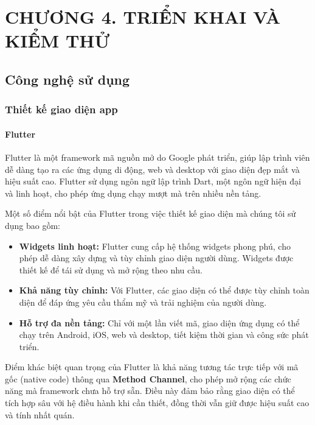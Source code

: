 
\section*{CHƯƠNG 4. TRIỂN KHAI VÀ KIỂM THỬ}
\setcounter{section}{4}
\setcounter{subsection}{0} %
\setcounter{table}{0} %
\setcounter{figure}{0} %

\subsection{Công nghệ sử dụng}
\subsubsection{Thiết kế giao diện app}
\paragraph{Flutter}
\mbox{}

Flutter là một framework mã nguồn mở do Google phát triển, giúp lập trình viên dễ dàng tạo ra các ứng dụng di động, web và desktop với giao diện đẹp mắt và hiệu suất cao. Flutter sử dụng ngôn ngữ lập trình Dart, một ngôn ngữ hiện đại và linh hoạt, cho phép ứng dụng chạy mượt mà trên nhiều nền tảng.

Một số điểm nổi bật của Flutter trong việc thiết kế giao diện mà chúng tôi sử dụng bao gồm:
\begin{itemize}
    \item \textbf{Widgets linh hoạt:} Flutter cung cấp hệ thống widgets phong phú, cho phép dễ dàng xây dựng và tùy chỉnh giao diện người dùng. Widgets được thiết kế để tái sử dụng và mở rộng theo nhu cầu.
    \item \textbf{Khả năng tùy chỉnh:} Với Flutter, các giao diện có thể được tùy chỉnh toàn diện để đáp ứng yêu cầu thẩm mỹ và trải nghiệm của người dùng.
    \item \textbf{Hỗ trợ đa nền tảng:} Chỉ với một lần viết mã, giao diện ứng dụng có thể chạy trên Android, iOS, web và desktop, tiết kiệm thời gian và công sức phát triển.
\end{itemize}

Điểm khác biệt quan trọng của Flutter là khả năng tương tác trực tiếp với mã gốc (native code) thông qua \textbf{Method Channel}, cho phép mở rộng các chức năng mà framework chưa hỗ trợ sẵn. Điều này đảm bảo rằng giao diện có thể tích hợp sâu với hệ điều hành khi cần thiết, đồng thời vẫn giữ được hiệu suất cao và tính nhất quán.


